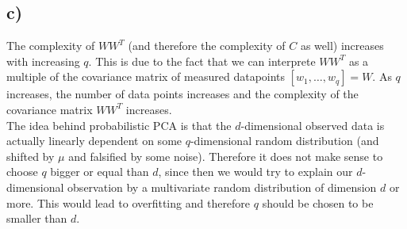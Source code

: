 \documentclass[paper=a4,fontsize=10pt,DIV11,BCOR10mm]{scrartcl}
\begin{document}
\subsection*{c)}
The complexity of $WW^T$ (and therefore the complexity of $C$ as well) increases with increasing $q$. This is due to the fact that we can interprete $WW^T$ as a multiple of the covariance matrix of measured datapoints $[w_1,\dots, w_q]=W$. As $q$ increases, the number of data points increases and the complexity of the covariance matrix $WW^T$ increases.\\

The idea behind probabilistic PCA is that the $d$-dimensional observed data is actually linearly dependent on some $q$-dimensional random distribution (and shifted by $\mu$ and falsified by some noise). Therefore it does not make sense to choose $q$ bigger or equal than $d$, since then we would try to explain our $d$-dimensional observation by a multivariate random distribution of dimension $d$ or more. This would lead to overfitting and therefore $q$ should be chosen to be smaller than $d$.
 
\end{document}
